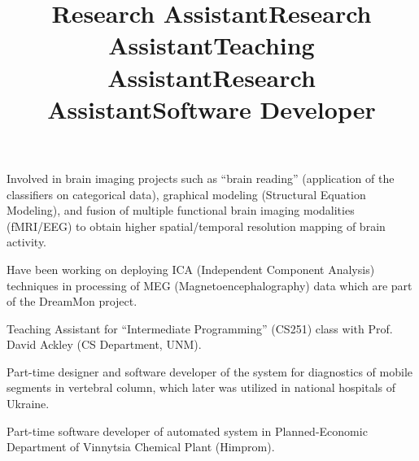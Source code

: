\documentclass[10pt,overlapped,line]{res}
\begin{document}
\begin{resume}
 \title{Research Assistant}
 \begin{position}
   Involved in brain imaging projects such as ``brain reading''
   (application of the classifiers on categorical data), graphical
   modeling (Structural Equation Modeling), and fusion of multiple
   functional brain imaging modalities (f{MRI}/{EEG}) to obtain higher
   spatial/temporal resolution mapping of brain activity.
   \\
 \end{position}

 \title{Research Assistant}
 \begin{position}
   Have been working  on deploying ICA (Independent Component
   Analysis) techniques in processing of MEG (Magnetoencephalography)
   data which are part of the DreamMon project.


 \end{position}

 \title{Teaching Assistant}
 \begin{position}
   Teaching Assistant for ``Intermediate Programming'' (CS251) class
   with Prof. David Ackley (CS Department, UNM).
 \end{position}


 \title{Research Assistant}
 \begin{position}
 Part-time designer and software developer of the system for
 diagnostics of mobile segments in vertebral column, which later was
 utilized in national hospitals of Ukraine.
 \end{position}

 \title{Software Developer}
 \begin{position}
 Part-time software developer of automated system in
 Planned-Economic Department of Vinnytsia Chemical Plant (Himprom).
 \end{position}


\end{resume}
\end{document}
